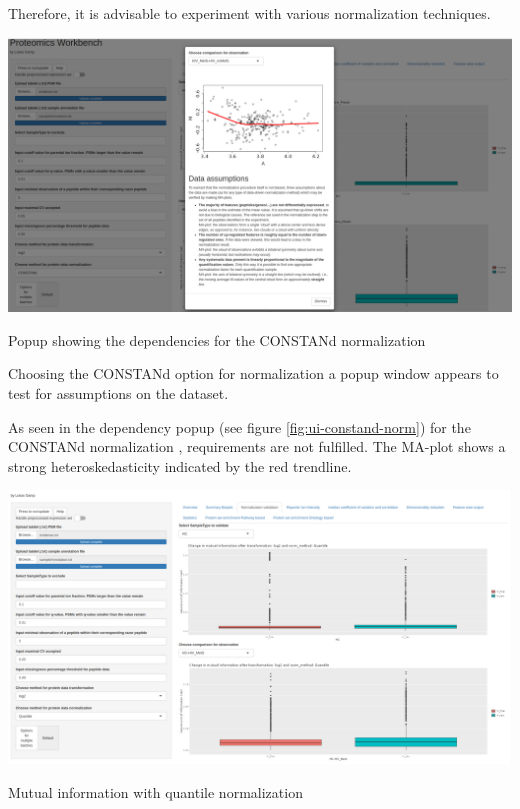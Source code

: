 \documentclass[
  11pt,
]{article}
\let\origfigure\figure
\begin{document}
Therefore, it is advisable to experiment with various normalization techniques.

\newpage
\bgroup  \origfigure[H] 

{\centering \includegraphics[width=1\linewidth]{screenshots/constand_norm_dependency} 

}

\caption{Popup showing the dependencies for the CONSTANd normalization}\label{fig:ui-constand-norm}
 \endfigure\egroup

Choosing the CONSTANd option for normalization a popup window appears to test for assumptions on the dataset.

As seen in the dependency popup (see figure \ref{fig:ui-constand-norm}) for the CONSTANd normalization \citep{VanHoutven2021}, requirements are not fulfilled. The MA-plot shows a strong heteroskedasticity indicated by the red trendline.

\newpage
\bgroup  \origfigure[H] 

{\centering \includegraphics[width=1\linewidth]{screenshots/mutual_info_quant_norm} 

}

\caption{Mutual information with quantile normalization}\label{fig:ui-mutual-info-quant-norm}
 \endfigure\egroup
\end{document}
